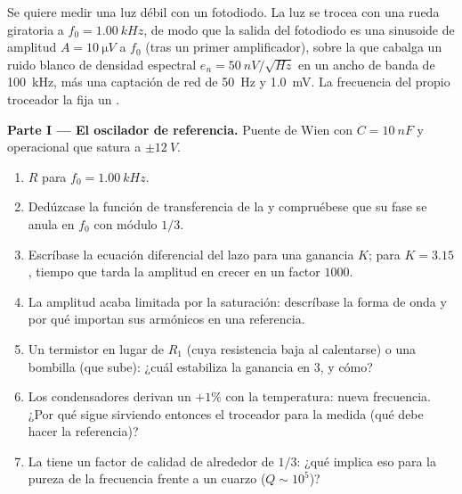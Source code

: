 \begin{problem}
\label{pb:b2:feedback-oscillators:1}

Se quiere medir una luz débil con un fotodiodo. La luz se trocea con una
rueda giratoria a $f_0 = \qty{1.00}{kHz}$, de modo que la salida del
fotodiodo es una sinusoide de amplitud $A = \qty{10}{\micro V}$ a $f_0$ (tras un
primer amplificador), sobre la que cabalga un ruido blanco de densidad
espectral $e_n = \qty{50}{nV/\sqrt{Hz}}$ en un ancho de banda de \qty{100}{kHz}, más una
captación de red de \qty{50}{Hz} y \qty{1.0}{mV}. La frecuencia del propio
troceador la fija un .

\medskip
\noindent\textbf{Parte I --- El oscilador de referencia.}
Puente de Wien con $C = \qty{10}{nF}$ y operacional que satura a $\pm\qty{12}{V}$.
\begin{enumerate}
  \item $R$ para $f_0 = \qty{1.00}{kHz}$.
  \item Dedúzcase la función de transferencia de la  y
        compruébese que su fase se anula en $f_0$ con módulo $1/3$.
  \item Escríbase la ecuación diferencial del lazo para una ganancia $K$;
        para $K = 3.15$, tiempo que tarda la amplitud en crecer en un
        factor $1000$.
  \item La amplitud acaba limitada por la saturación: descríbase la forma
        de onda y por qué importan sus armónicos en una referencia.
  \item Un termistor en lugar de $R_1$ (cuya resistencia baja al
        calentarse) o una bombilla (que sube): ¿cuál estabiliza la
        ganancia en 3, y cómo?
  \item Los condensadores derivan un $+1\%$ con la temperatura: nueva
        frecuencia. ¿Por qué sigue sirviendo entonces el troceador para la
        medida (qué debe hacer la referencia)?
  \item La  tiene un factor de calidad de alrededor de $1/3$:
        ¿qué implica eso para la pureza de la frecuencia frente a un
        cuarzo ($Q \sim 10^5$)?
\end{enumerate}


\end{problem}
